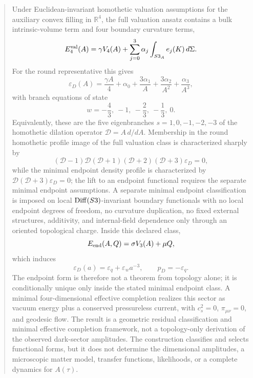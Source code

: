 \documentclass[11pt,a4paper]{article}
\def\Sthree{S3}%
\def\dd{d}%
\numberwithin{equation}{section}
\theoremstyle{remark}
\newcommand{\Sthree}{S^3}
\newcommand{\Dil}{\mathscr{D}}
\newcommand{\Efour}{E_4}
\newcommand{\epsD}{\varepsilon_D}
\newcommand{\pD}{p_D}
\newcommand{\dd}{\mathrm{d}}
\begin{document}
\begin{abstract}
Under Euclidean-invariant homothetic valuation assumptions for the auxiliary convex filling in \(\mathbb{R}^4\), the full valuation ansatz contains a bulk intrinsic-volume term and four boundary curvature terms,
\begin{equation*}
\Efour^{\rm val}(A)=\gamma V_4(A)+\sum_{j=0}^{3}\alpha_j
\int_{\Sthree_A}e_j(K)\,\dd\Sigma .
\end{equation*}
For the round representative this gives
\begin{equation*}
\epsD(A)=
\frac{\gamma A}{4}
+\alpha_0+\frac{3\alpha_1}{A}
+\frac{3\alpha_2}{A^2}
+\frac{\alpha_3}{A^3},
\end{equation*}
with branch equations of state
\begin{equation*}
w=-\frac43,\ -1,\ -\frac23,\ -\frac13,\ 0.
\end{equation*}
Equivalently, these are the five eigenbranches \(s=1,0,-1,-2,-3\) of the homothetic dilation operator \(\Dil=A\,\dd/\dd A\). Membership in the round homothetic profile image of the full valuation class is characterized sharply by
\begin{equation*}
(\Dil-1)\Dil(\Dil+1)(\Dil+2)(\Dil+3)\epsD=0,
\end{equation*}
while the minimal endpoint density profile is characterized by \(\Dil(\Dil+3)\epsD=0\); the lift to an endpoint functional requires the separate minimal endpoint assumptions.
A separate minimal endpoint classification is imposed on local \({\rm Diff}(\Sthree)\)-invariant boundary functionals with no local endpoint degrees of freedom, no curvature duplication, no fixed external structures, additivity, and internal-field dependence only through an oriented topological charge. Inside this declared class,
\begin{equation*}
E_{\rm end}(A,Q)=\sigma V_3(A)+\mu Q,
\end{equation*}
which induces
\begin{equation*}
\epsD(a)=\varepsilon_q+\varepsilon_w a^{-3},
\qquad
\pD=-\varepsilon_q .
\end{equation*}
The endpoint form is therefore not a theorem from topology alone; it is conditionally unique only inside the stated minimal endpoint class. A minimal four-dimensional effective completion realizes this sector as vacuum energy plus a conserved pressureless current, with \(c_s^2=0\), \(\pi_{\mu\nu}=0\), and geodesic flow. The result is a geometric residual classification and minimal effective completion framework, not a topology-only derivation of the observed dark-sector amplitudes. The construction classifies and selects functional forms, but it does not determine the dimensional amplitudes, a microscopic matter model, transfer functions, likelihoods, or a complete dynamics for \(A(\tau)\).
\end{abstract}
\end{document}
